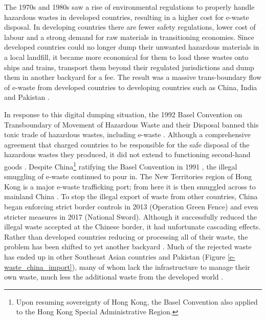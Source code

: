 \documentclass{article}
\begin{document}
The 1970s and 1980s saw a rise of environmental regulations to properly handle hazardous wastes in developed countries, resulting in a higher cost for e-waste disposal. In developing countries  there are fewer safety regulations, lower cost of labour and a strong demand for raw materials in transitioning economies. Since developed countries could no longer dump their unwanted hazardous materials in a local landfill, it became more economical for them to load these wastes onto ships and trains, transport them beyond their regulated jurisdictions and dump them in another backyard for a fee. The result was a massive trans-boundary flow of e-waste from developed countries to developing countries such as China, India and Pakistan  \cite{sthiannopkao2013handling, zhang2012waste}.

In response to this digital dumping situation, the 1992 Basel Convention on Transboundary of Movement of Hazardous Waste and their Disposal banned this toxic trade of hazardous wastes, including e-waste \cite{baselconvention2011}. Although a comprehensive agreement that charged countries to be responsible for the safe disposal of the hazardous wastes they produced, it did not extend to functioning second-hand goods \cite{sthiannopkao2013handling}. Despite China\footnote{Upon resuming sovereignty of Hong Kong, the Basel Convention also applied to the Hong Kong Special Administrative Region.} ratifying the Basel Convention in 1991 \cite{baselconvention2011ratify}, the illegal smuggling of e-waste continued to pour in. The New Territories region of Hong Kong is a major e-waste trafficking port; from here it is then smuggled across to mainland China \cite{ban2018carecyclingexport}. To stop the illegal export of waste from other countries, China began enforcing strict border controls in 2013 (Operation Green Fence) and even stricter measures in 2017 (National Sword). Although it successfully reduced the illegal waste accepted at the Chinese border, it had unfortunate cascading effects. Rather than developed countries reducing or processing all of their waste, the problem has been shifted to yet another backyard \cite{financialtimes2018nationalsword}. Much of the rejected waste has ended up in other Southeast Asian countries and Pakistan (Figure \ref{e-waste_china_import}), many of whom lack the infrastructure to manage their own waste, much less the additional waste from the developed world \cite{ban2018carecyclingexport, brooks2018chinese}.
\end{document}
